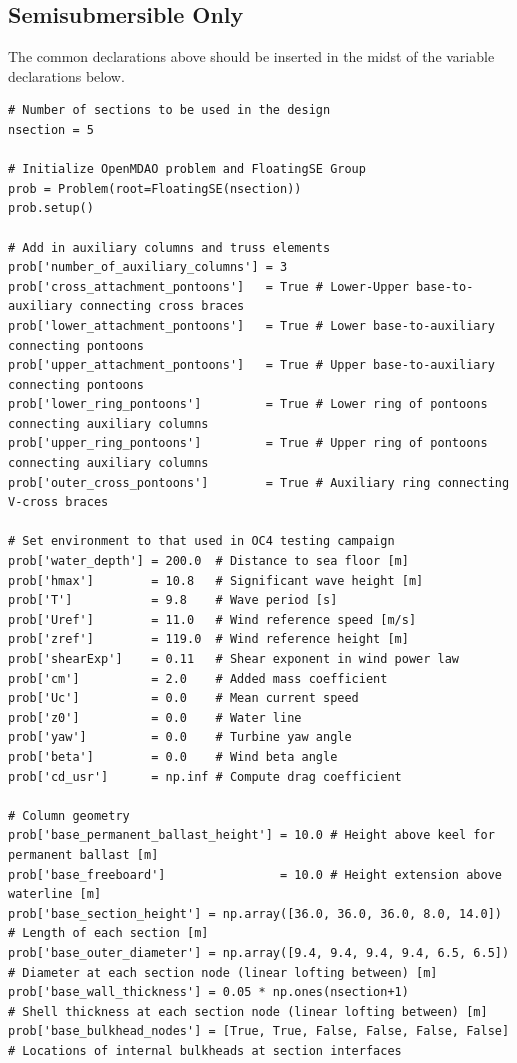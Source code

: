 \subsection{Semisubmersible Only}
The common declarations above should be inserted in the midst of the
variable declarations below.
\begin{lstlisting}
# Number of sections to be used in the design
nsection = 5

# Initialize OpenMDAO problem and FloatingSE Group
prob = Problem(root=FloatingSE(nsection))
prob.setup()

# Add in auxiliary columns and truss elements
prob['number_of_auxiliary_columns'] = 3
prob['cross_attachment_pontoons']   = True # Lower-Upper base-to-auxiliary connecting cross braces
prob['lower_attachment_pontoons']   = True # Lower base-to-auxiliary connecting pontoons
prob['upper_attachment_pontoons']   = True # Upper base-to-auxiliary connecting pontoons
prob['lower_ring_pontoons']         = True # Lower ring of pontoons connecting auxiliary columns
prob['upper_ring_pontoons']         = True # Upper ring of pontoons connecting auxiliary columns
prob['outer_cross_pontoons']        = True # Auxiliary ring connecting V-cross braces

# Set environment to that used in OC4 testing campaign
prob['water_depth'] = 200.0  # Distance to sea floor [m]
prob['hmax']        = 10.8   # Significant wave height [m]
prob['T']           = 9.8    # Wave period [s]
prob['Uref']        = 11.0   # Wind reference speed [m/s]
prob['zref']        = 119.0  # Wind reference height [m]
prob['shearExp']    = 0.11   # Shear exponent in wind power law
prob['cm']          = 2.0    # Added mass coefficient
prob['Uc']          = 0.0    # Mean current speed
prob['z0']          = 0.0    # Water line
prob['yaw']         = 0.0    # Turbine yaw angle
prob['beta']        = 0.0    # Wind beta angle
prob['cd_usr']      = np.inf # Compute drag coefficient

# Column geometry
prob['base_permanent_ballast_height'] = 10.0 # Height above keel for permanent ballast [m]
prob['base_freeboard']                = 10.0 # Height extension above waterline [m]
prob['base_section_height'] = np.array([36.0, 36.0, 36.0, 8.0, 14.0])  # Length of each section [m]
prob['base_outer_diameter'] = np.array([9.4, 9.4, 9.4, 9.4, 6.5, 6.5]) # Diameter at each section node (linear lofting between) [m]
prob['base_wall_thickness'] = 0.05 * np.ones(nsection+1)               # Shell thickness at each section node (linear lofting between) [m]
prob['base_bulkhead_nodes'] = [True, True, False, False, False, False] # Locations of internal bulkheads at section interfaces


\end{lstlisting}
